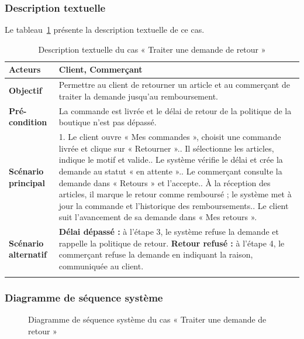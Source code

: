 \subsubsection{Description textuelle}
Le tableau~\ref{tab:uc-retour} présente la description textuelle de ce cas.
\renewcommand{\arraystretch}{1.5}
\begin{longtable}{|p{4cm}|p{11cm}|}
\hline
\textbf{Acteurs} & Client, Commerçant \\
\hline
\textbf{Objectif} & Permettre au client de retourner un article et au commerçant de traiter la demande jusqu'au remboursement. \\
\hline
\textbf{Pré-condition} & La commande est livrée et le délai de retour de la politique de la boutique n'est pas dépassé. \\
\hline
\textbf{Scénario principal} &
1. Le client ouvre « Mes commandes », choisit une commande livrée et clique sur « Retourner ».\newline
2. Il sélectionne les articles, indique le motif et valide.\newline
3. Le système vérifie le délai et crée la demande au statut « en attente ».\newline
4. Le commerçant consulte la demande dans « Retours » et l'accepte.\newline
5. À la réception des articles, il marque le retour comme remboursé ; le système met à jour la commande et l'historique des remboursements.\newline
6. Le client suit l'avancement de sa demande dans « Mes retours ». \\
\hline
\textbf{Scénario alternatif} &
\textbf{Délai dépassé :} à l'étape 3, le système refuse la demande et rappelle la politique de retour.\newline
\textbf{Retour refusé :} à l'étape 4, le commerçant refuse la demande en indiquant la raison, communiquée au client. \\
\hline
\caption{Description textuelle du cas « Traiter une demande de retour »}
\label{tab:uc-retour}
\end{longtable}

\subsubsection{Diagramme de séquence système}
\begin{figure}[H]
    \centering
    \caption{Diagramme de séquence système du cas « Traiter une demande de retour »}
    \label{fig:dss-retour}
\end{figure}

